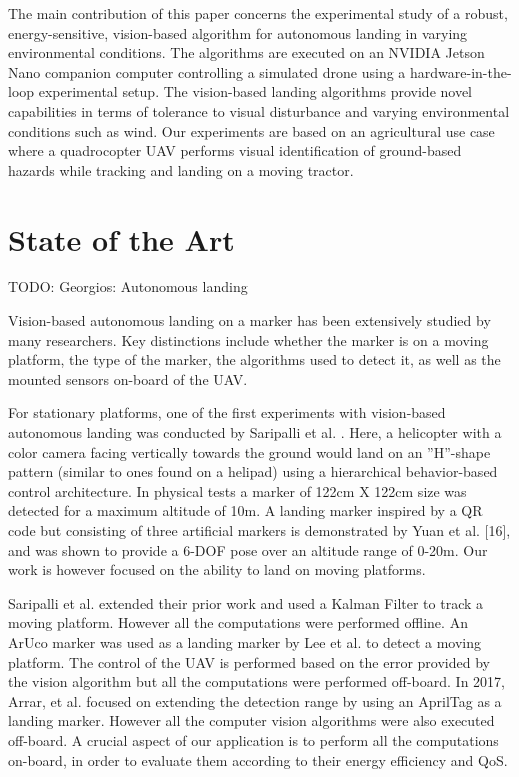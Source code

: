 \documentclass[conference]{IEEEtran}
\begin{document}
The main contribution of this paper concerns the experimental study of a robust, energy-sensitive, vision-based algorithm for autonomous landing in varying environmental conditions. The algorithms are executed on an NVIDIA Jetson Nano companion computer controlling a simulated drone using a hardware-in-the-loop experimental setup. The vision-based landing algorithms provide novel capabilities in terms of tolerance to visual disturbance and varying environmental conditions such as wind.
%
Our experiments are based on an agricultural use case where a quadrocopter UAV performs visual identification of ground-based hazards while tracking and landing on a moving tractor. %

\section{State of the Art}
\label{sec:state-of-the-art}

TODO: Georgios: Autonomous landing

Vision-based autonomous landing on a marker has been extensively studied by many researchers. Key distinctions include whether the marker is on a moving platform, the type of the marker, the algorithms used to detect it, as well as the mounted sensors on-board of the UAV.

For stationary platforms, one of the first experiments with vision-based autonomous landing was conducted by Saripalli et al. \cite{saripalli2002vision}. Here, a helicopter with a color camera facing vertically towards the ground would land on an ”H”-shape pattern (similar to ones found on a helipad) using a hierarchical behavior-based control architecture. In physical tests a marker of 122cm X 122cm size was detected for a maximum altitude of 10m. A landing marker inspired by a QR code but consisting of three artificial markers is demonstrated by Yuan et al. [16], and was shown to provide a 6-DOF pose over an altitude range of 0-20m. Our work is however focused on the ability to land on moving platforms.

Saripalli et al. \cite{saripalli2003landing} extended their prior work and used a Kalman Filter to track a moving platform. However all the computations were performed offline. An ArUco marker was used as a landing marker by Lee et al. \cite{lee2012autonomous} to detect a moving platform. The control of the UAV is performed based on the error provided by the vision algorithm but all the computations were performed off-board. In 2017, Arrar, et al. \cite{araar2017vision} focused on extending the detection range by using an AprilTag  \cite{olson2011apriltag} as a landing marker. However all the computer vision algorithms were also executed off-board. A crucial aspect of our application is to perform all the computations on-board, in order to evaluate them according to their energy efficiency and QoS.
\end{document}
